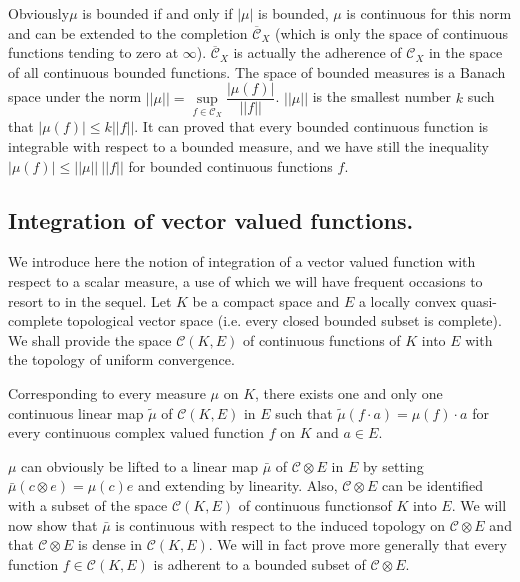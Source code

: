  Obviously\pageoriginale $\mu$ is bounded if and only if $|\mu|$ is
 bounded, $\mu$ 
 is continuous for this norm and can be extended to the completion
 $\overline{\mathscr{C}}_{X} $ (which is only the space of continuous
 functions tending to zero at $\infty$). $\overline{\mathscr{C}}_{X}$
 is actually the adherence of $\mathscr{C}_X$ in the space of all
 continuous bounded functions. The space of bounded measures is a
 Banach space under the norm $||\mu|| = \sup\limits_{f \in
   \mathscr{C}_X} \dfrac{|\mu(f)|}{|| f ||}$. $||\mu||$ is the
 smallest number $k$ such that  $| \mu (f) | \leq k || f ||$. It can
 proved that every bounded continuous function is integrable with
 respect to a bounded measure, and we have still the inequality $| \mu
 (f) | \leq || \mu ||~ || f ||$ for bounded continuous functions $f$.  


\subsection{Integration of vector valued
 functions.}\label{partII-chap1-sec1.5}%

We introduce here the notion of integration of a vector valued
function with respect to a scalar measure, a use  of which we will
have frequent occasions to resort to in the sequel. Let $K$ be a
compact space and $E$ a locally convex quasi-complete topological
vector space (i.e. every closed bounded subset is complete). We shall
provide the space $\mathscr{C} (K, E)$ of continuous functions of $K$
into $E$ with the topology of uniform convergence. 

\setcounter{thm}{0}
\begin{thm}\label{partII-chap1-thm1}%
 {Corresponding to every measure} $\mu$ {on} $K$, {there
   exists one and only one continuous linear map} $\tilde{\mu}$ of
 $\mathscr{C} (K,E)$ {in} $E$ {such that}  $\tilde{\mu} (f\cdot a)
 = \mu (f)\cdot a$ {for every continuous complex valued function} $f$
 {on} $K$ {and} $a \in E$. 
\end{thm}

$\mu$ can obviously be lifted to a linear map $\bar{\mu}$ of
$\mathscr{C} \otimes E$ in $E$ by setting $\bar{\mu}  (c \otimes
e) = \mu(c)e$ and extending by linearity. Also, $\mathscr{C} \otimes
E$ can be identified with a subset of the space $\mathscr{C}(K, E)$ of
continuous functions\pageoriginale of $K$ into $E$. We will now show that
$\bar{\mu}$ is continuous with respect to the induced topology on
$\mathscr{C} \otimes  E$  and that $\mathscr{C} \otimes E$ is dense in
$\mathscr{C}(K,E)$. We will in fact prove more generally that every
function $f \in \mathscr{C} (K,E)$ is adherent to a bounded subset of
$\mathscr{C} \otimes E$. 


